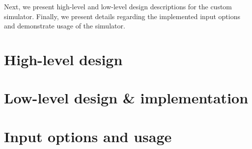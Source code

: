 Next, we present high-level and low-level design descriptions 
for the custom simulator. Finally, we present details regarding the
implemented input options and demonstrate usage of the simulator.

\section{High-level design}
\label{sec:simreplaychap-design}


\section{Low-level design \& implementation}
\label{sec:simreplaychap-implementation}


\section{Input options and usage}
\label{sec:simreplaychap-usage}

